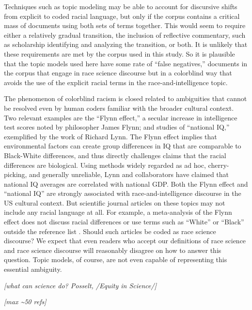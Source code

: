 \documentclass[12pt]{article}
\newcounter{lastnote}
\begin{document}
Techniques such as topic modeling may be able to account for discursive shifts from explicit to coded racial language, but only if the corpus contains a critical mass of documents using both sets of terms together. This would seem to require either a relatively gradual transition, the inclusion of reflective commentary, such as scholarship identifying and analyzing the transition, or both. It is unlikely that these requirements are met by the corpus used in this study. So it is plausible that the topic models used here have some rate of ``false negatives,'' documents in the corpus that engage in race science discourse but in a colorblind way that avoids the use of the explicit racial terms in the race-and-intelligence topic.

The phenomenon of colorblind racism is closed related to ambiguities that cannot be resolved even by human coders familiar with the broader cultural context. Two relevant examples are the ``Flynn effect,'' a secular increase in intelligence test scores noted by philosopher James Flynn; and studies of ``national IQ,'' exemplified by the work of Richard Lynn. The Flynn effect implies that environmental factors can create group differences in IQ that are comparable to Black-White differences, and thus directly challenges claims that the racial differences are biological. Using methods widely regarded as ad hoc, cherry-picking, and generally unreliable, Lynn and collaborators have claimed that national IQ averages are correlated with national GDP. Both the Flynn effect and ``national IQ'' are strongly associated with race-and-intelligence discourse in the US cultural context. But scientific journal articles on these topics may not include any racial language at all. For example, a meta-analysis of the Flynn effect does not discuss racial differences or use terms such as ``White'' or ``Black'' outside the reference list \cite{TrahanFlynnEffectMetaanalysis2014}. Should such articles be coded as race science discourse? We expect that even readers who accept our definitions of race science and race science discourse will reasonably disagree on how to answer this question. Topic models, of course, are not even capable of representing this essential ambiguity.

\emph{{[}what can science do? Posselt, /Equity in Science/{]}}

\emph{{[}max \textasciitilde50 refs{]}}



\end{document}
